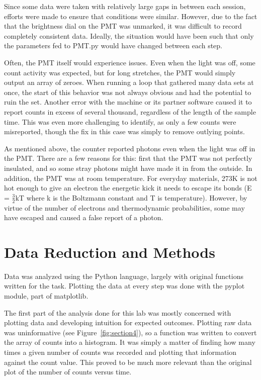 \documentclass[a4paper,12pt]{article}
\begin{document}
Since some data were taken with relatively large gaps in between each session, efforts were made to ensure that conditions were similar. However, due to the fact that the brightness dial on the PMT was unmarked, it was difficult to record completely consistent data. Ideally, the situation would have been such that only the parameters fed to PMT.py would have changed between each step.

Often, the PMT itself would experience issues. Even when the light was off, some count activity was expected, but for long stretches, the PMT would simply output an array of zeroes. When running a loop that gathered many data sets at once, the start of this behavior was not always obvious and had the potential to ruin the set. Another error with the machine or its partner software caused it to report counts in excess of several thousand, regardless of the length of the sample time. This was even more challenging to identify, as only a few counts were misreported, though the fix in this case was simply to remove outlying points.

As mentioned above, the counter reported photons even when the light was off in the PMT. There are a few reasons for this: first that the PMT was not perfectly insulated, and so some stray photons might have made it in from the outside. In addition, the PMT was at room temperature. For everyday materials, 273K is not hot enough to give an electron the energetic kick it needs to escape its bonds (E = $\frac{3}{2}$kT where k is the Boltzmann constant and T is temperature). However, by virtue of the number of electrons and thermodynamic probabilities, some may have escaped and caused a false report of a photon. 

\section {Data Reduction and Methods}
\label{sec:methods}

Data was analyzed using the Python language, largely with original functions written for the task. Plotting the data at every step was done with the pyplot module, part of matplotlib.

The first part of the analysis done for this lab was mostly concerned with plotting data and developing intuition for expected outcomes. Plotting raw data was uninformative (see Figure~\ref{fig:section4}), so a function was written to convert the array of counts into a histogram. It was simply a matter of finding how many times a given number of counts was recorded and plotting that information against the count value. This proved to be much more relevant than the original plot of the number of counts versus time.
\end{document}

